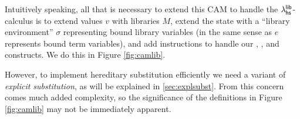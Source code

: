 \documentclass[11pt]{article}
\begin{document}

\newcommand{\Lib}[1]{\ms{Lib}(#1)}
\newcommand{\Use}[1]{\ms{Use}(#1)}
\newcommand{\Load}{\ms{Load}}
\newcommand{\Func}[2]{\ms{Func}({#1},\,{#2})}
\newcommand{\M}{\ensuremath{\mathcal{M}}}
\newcommand{\R}{\ensuremath{\mathcal{R}}}
\newcommand{\uncode}[1]{\ensuremath{\ms{code}^{-1}}\:(#1)}

Intuitively speaking, all that is necessary to extend this CAM to handle the
$\lambda^{\textsf{lib}}_{\textsf{hs}}$-calculus is to extend values $v$ with libraries $M$, extend the state
with a ``library environment'' $\sigma$ representing bound library variables (in
the same sense as $e$ represents bound term variables), and add instructions to
handle our , , and  constructs. We do this in Figure
\ref{fig:camlib}.

However, to implement hereditary substitution efficiently we need a variant of
\emph{explicit substitution}, as will be explained in \ref{sec:explsubst}. From
this concern comes much added complexity, so the significance of the definitions
in Figure \ref{fig:camlib} may not be immediately apparent.


\end{document}

